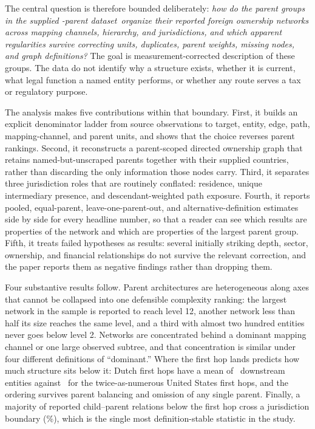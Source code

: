 \documentclass[11pt]{article}
\newcommand{\pct}{\%}
\newcommand{\sample}{the supplied \Parents-parent dataset}
\begin{document}
The central question is therefore bounded deliberately: \emph{how do the parent
groups in \sample\ organize their reported foreign ownership networks across
mapping channels, hierarchy, and jurisdictions, and which apparent regularities
survive correcting units, duplicates, parent weights, missing nodes, and graph
definitions?} The goal is measurement-corrected description of these groups.
The data do not identify why a structure exists, whether it is current, what
legal function a named entity performs, or whether any route serves a tax or
regulatory purpose.

The analysis makes five contributions within that boundary. First, it builds an
explicit denominator ladder from source observations to target, entity, edge,
path, mapping-channel, and parent units, and shows that the choice reverses
parent rankings. Second, it reconstructs a parent-scoped directed ownership
graph that retains named-but-unscraped parents together with their supplied
countries, rather than discarding the only information those nodes carry.
Third, it separates three jurisdiction roles that are routinely conflated:
residence, unique intermediary presence, and descendant-weighted path exposure.
Fourth, it reports pooled, equal-parent, leave-one-parent-out, and
alternative-definition estimates side by side for every headline number, so
that a reader can see which results are properties of the network and which are
properties of the largest parent group. Fifth, it treats failed hypotheses as
results: several initially striking depth, sector, ownership, and financial
relationships do not survive the relevant correction, and the paper reports
them as negative findings rather than dropping them.

Four substantive results follow. Parent architectures are heterogeneous along
axes that cannot be collapsed into one defensible complexity ranking: the
largest network in the sample is reported to reach level 12, another network
less than half its size reaches the same level, and a third with almost two hundred
entities never goes below level 2. Networks are concentrated behind a dominant
mapping channel or one large observed subtree, and that concentration is
similar under four different definitions of ``dominant.'' Where the first hop
lands predicts how much structure sits below it: Dutch first hops have a mean
of \DutchGatewayMean\ downstream entities against \DutchGatewayUsMean\ for the
twice-as-numerous United States first hops, and the ordering survives parent
balancing and omission of any single parent. Finally, a majority of reported
child--parent relations below the first hop cross a jurisdiction boundary
(\CrossBorderPct\pct), which is the single most definition-stable statistic in
the study.
\end{document}
